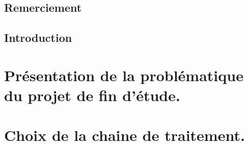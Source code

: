 \documentclass[12pt,fleqn]{report} %
\begin{document}
\renewcommand{\contentsname}{Sommaire}%
\renewcommand{\listfigurename}{Table des figures}%
\renewcommand{\listtablename}{Table des tableaux}%
\renewcommand{\bibname}{Bibliographie}  %




\afterpage{\null\newpage}


\chapter*{Remerciement}


\tableofcontents  %
\cleardoublepage  %

%

\chapter*{Introduction}



\part{Présentation de la problématique du projet de fin d'étude.}


\part{Choix de la chaine de traitement.}

\end{document}
